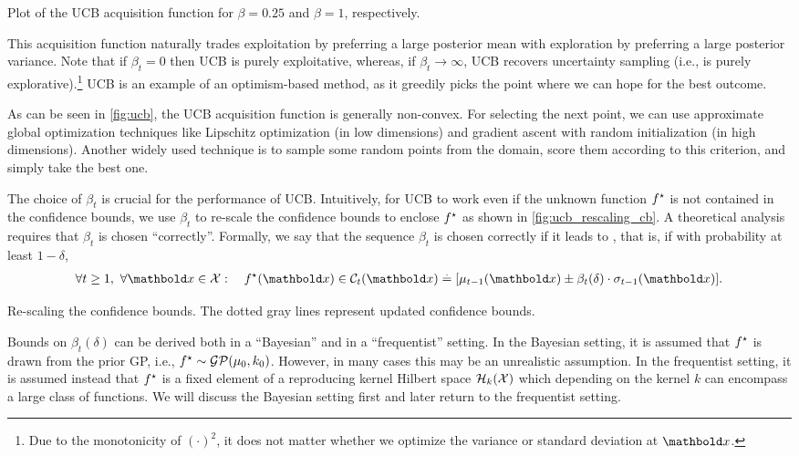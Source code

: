 \begin{marginfigure}[-5\baselineskip]
  \caption{Plot of the UCB acquisition function for $\beta = 0.25$ and $\beta = 1$, respectively.}\label{fig:ucb}
\end{marginfigure}

This acquisition function naturally trades exploitation by preferring a large posterior mean with exploration by preferring a large posterior variance.
Note that if $\beta_t = 0$ then UCB is purely exploitative, whereas, if $\beta_t \to \infty$, UCB recovers uncertainty sampling (i.e., is purely explorative).\footnote{Due to the monotonicity of $(\cdot)^2$, it does not matter whether we optimize the variance or standard deviation at $\vx$.}
UCB is an example of an optimism-based method, as it greedily picks the point where we can hope for the best outcome.

As can be seen in \cref{fig:ucb}, the UCB acquisition function is generally non-convex.
For selecting the next point, we can use approximate global optimization techniques like Lipschitz optimization (in low dimensions) and gradient ascent with random initialization (in high dimensions).
Another widely used technique is to sample some random points from the domain, score them according to this criterion, and simply take the best one.

The choice of $\beta_t$ is crucial for the performance of UCB.
Intuitively, for UCB to work even if the unknown function $f^\star$ is not contained in the confidence bounds, we use $\beta_t$ to re-scale the confidence bounds to enclose $f^\star$ as shown in \cref{fig:ucb_rescaling_cb}.
A theoretical analysis requires that $\beta_t$ is chosen ``correctly''.
Formally, we say that the sequence $\beta_t$ is chosen correctly if it leads to , that is, if with probability at least $1-\delta$, \begin{align}
  \forall t \geq 1,\ \forall \vx \in \spX :\quad \opt{f}(\vx) \in \spC_t(\vx) \defeq \brackets*{\mu_{t-1}(\vx) \pm \beta_t(\delta) \cdot \sigma_{t-1}(\vx)}. \label{eq:gp_ucb_beta_calibration}
\end{align}
\begin{marginfigure}
  \caption{Re-scaling the confidence bounds. The dotted gray lines represent updated confidence bounds.}\label{fig:ucb_rescaling_cb}
\end{marginfigure}
Bounds on $\beta_t(\delta)$ can be derived both in a ``Bayesian'' and in a ``frequentist'' setting.
In the Bayesian setting, it is assumed that $f^\star$ is drawn from the prior GP, i.e., $\opt{f} \sim \GP{\mu_0}{k_0}$.
However, in many cases this may be an unrealistic assumption.
In the frequentist setting, it is assumed instead that $f^\star$ is a fixed element of a reproducing kernel Hilbert space $\mathcal{H}_k(\mathcal{X})$ which depending on the kernel $k$ can encompass a large class of functions.
We will discuss the Bayesian setting first and later return to the frequentist setting.

